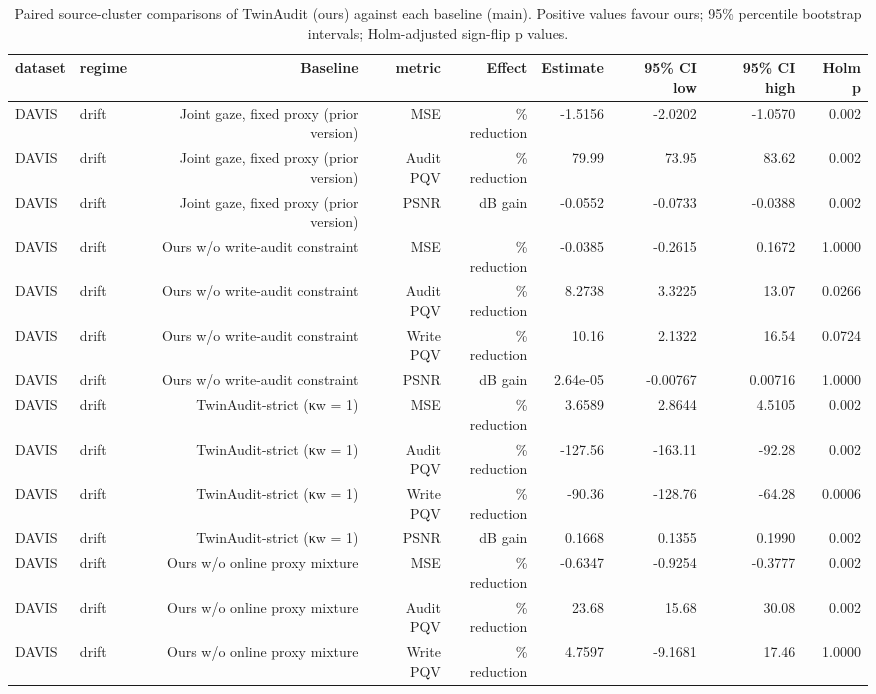 \begin{table}[t]
\centering
\caption{Paired source-cluster comparisons of TwinAudit (ours) against each baseline (main). Positive values favour ours; 95\% percentile bootstrap intervals; Holm-adjusted sign-flip p values.}
\label{tab:paired_main}
\small
\begin{tabular}{llrrrrrrr}
\toprule
dataset & regime & Baseline & metric & Effect & Estimate & 95\% CI low & 95\% CI high & Holm p \\
\midrule
DAVIS & drift & Joint gaze, fixed proxy (prior version) & MSE & \% reduction & -1.5156 & -2.0202 & -1.0570 & 0.002 \\
DAVIS & drift & Joint gaze, fixed proxy (prior version) & Audit PQV & \% reduction & 79.99 & 73.95 & 83.62 & 0.002 \\
DAVIS & drift & Joint gaze, fixed proxy (prior version) & PSNR & dB gain & -0.0552 & -0.0733 & -0.0388 & 0.002 \\
DAVIS & drift & Ours w/o write-audit constraint & MSE & \% reduction & -0.0385 & -0.2615 & 0.1672 & 1.0000 \\
DAVIS & drift & Ours w/o write-audit constraint & Audit PQV & \% reduction & 8.2738 & 3.3225 & 13.07 & 0.0266 \\
DAVIS & drift & Ours w/o write-audit constraint & Write PQV & \% reduction & 10.16 & 2.1322 & 16.54 & 0.0724 \\
DAVIS & drift & Ours w/o write-audit constraint & PSNR & dB gain & 2.64e-05 & -0.00767 & 0.00716 & 1.0000 \\
DAVIS & drift & TwinAudit-strict (κw = 1) & MSE & \% reduction & 3.6589 & 2.8644 & 4.5105 & 0.002 \\
DAVIS & drift & TwinAudit-strict (κw = 1) & Audit PQV & \% reduction & -127.56 & -163.11 & -92.28 & 0.002 \\
DAVIS & drift & TwinAudit-strict (κw = 1) & Write PQV & \% reduction & -90.36 & -128.76 & -64.28 & 0.0006 \\
DAVIS & drift & TwinAudit-strict (κw = 1) & PSNR & dB gain & 0.1668 & 0.1355 & 0.1990 & 0.002 \\
DAVIS & drift & Ours w/o online proxy mixture & MSE & \% reduction & -0.6347 & -0.9254 & -0.3777 & 0.002 \\
DAVIS & drift & Ours w/o online proxy mixture & Audit PQV & \% reduction & 23.68 & 15.68 & 30.08 & 0.002 \\
DAVIS & drift & Ours w/o online proxy mixture & Write PQV & \% reduction & 4.7597 & -9.1681 & 17.46 & 1.0000 \\

\end{tabular}
\end{table}
